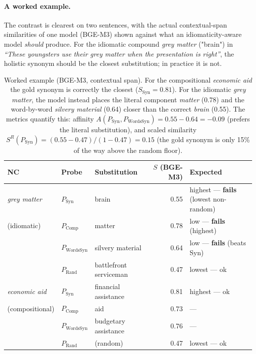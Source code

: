 \documentclass[11pt]{article}
\begin{document}
\paragraph{A worked example.} The contrast is clearest on two sentences, with the actual
contextual-span similarities of one model (BGE-M3) shown against what an idiomaticity-aware model
\emph{should} produce. For the idiomatic compound \emph{grey matter} ("brain") in \emph{``These
youngsters use their grey matter when the presentation is right''}, the holistic synonym should be
the closest substitution; in practice it is not.

\begin{table}[H]
\centering
\small
\begin{tabular}{lllrl}
\toprule
NC & Probe & Substitution & $S$ (BGE-M3) & Expected \\
\midrule
\emph{grey matter} & $P_{\mathrm{Syn}}$ & brain & 0.55 & highest --- \textbf{fails} (lowest non-random) \\
(idiomatic) & $P_{\mathrm{Comp}}$ & matter & 0.78 & low --- \textbf{fails} (highest) \\
 & $P_{\mathrm{WordsSyn}}$ & silvery material & 0.64 & low --- \textbf{fails} (beats Syn) \\
 & $P_{\mathrm{Rand}}$ & battlefront serviceman & 0.47 & lowest --- ok \\
\midrule
\emph{economic aid} & $P_{\mathrm{Syn}}$ & financial assistance & 0.81 & highest --- ok \\
(compositional) & $P_{\mathrm{Comp}}$ & aid & 0.73 & --- \\
 & $P_{\mathrm{WordsSyn}}$ & budgetary assistance & 0.76 & --- \\
 & $P_{\mathrm{Rand}}$ & (random) & 0.47 & lowest --- ok \\
\bottomrule
\end{tabular}
\caption{Worked example (BGE-M3, contextual span). For the compositional \emph{economic aid} the
gold synonym is correctly the closest ($S_{\mathrm{Syn}}=0.81$). For the idiomatic \emph{grey
matter}, the model instead places the literal component \emph{matter} (0.78) and the word-by-word
\emph{silvery material} (0.64) closer than the correct \emph{brain} (0.55). The metrics quantify
this: affinity $A(P_{\mathrm{Syn}},P_{\mathrm{WordsSyn}})=0.55-0.64=-0.09$ (prefers the literal
substitution), and scaled similarity $S^R(P_{\mathrm{Syn}})=(0.55-0.47)/(1-0.47)=0.15$ (the gold
synonym is only 15\% of the way above the random floor).}
\label{tab:worked}
\end{table}
\end{document}
